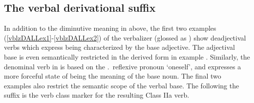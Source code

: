\subsection{The verbal derivational suffix }\label{vblzDALL}
In addition to the diminutive meaning in  above, 
the first two examples \mbox{(\ref{vblzDALLex1}-\ref{vblzDALLex2})} of the verbalizer  (glossed as ) show deadjectival verbs which express being characterized by the base adjective. The adjectival base is even semantically restricted in the derived form in example . 
Similarly, the denominal verb in  is based on the \SGs.\NOMs\ reflexive pronoun  ‘oneself’, and expresses a more forceful state of being the meaning of the base noun. The final two examples also restrict the semantic scope of the verbal base. 
The  following the  suffix is the verb class marker for the resulting Class IIa verb. 
\ea\label{vblzDALLex1}
\z
\ea\label{vblzDALLex2}
\z
\ea\label{vblzDALLex3}
\z
\ea\label{vblzDALLex4}
\z
\ea\label{vblzDALLex5}
\z






